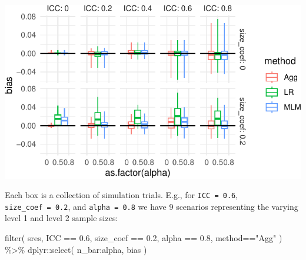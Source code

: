 \documentclass[
]{book}
\newenvironment{Shaded}{\begin{snugshade}}{\end{snugshade}}
\newcommand{\AttributeTok}[1]{\textcolor[rgb]{0.77,0.63,0.00}{#1}}
\newcommand{\ConstantTok}[1]{\textcolor[rgb]{0.00,0.00,0.00}{#1}}
\newcommand{\DecValTok}[1]{\textcolor[rgb]{0.00,0.00,0.81}{#1}}
\newcommand{\FloatTok}[1]{\textcolor[rgb]{0.00,0.00,0.81}{#1}}
\newcommand{\FunctionTok}[1]{\textcolor[rgb]{0.00,0.00,0.00}{#1}}
\newcommand{\NormalTok}[1]{#1}
\newcommand{\OtherTok}[1]{\textcolor[rgb]{0.56,0.35,0.01}{#1}}
\newcommand{\SpecialCharTok}[1]{\textcolor[rgb]{0.00,0.00,0.00}{#1}}
\newcommand{\StringTok}[1]{\textcolor[rgb]{0.31,0.60,0.02}{#1}}
\begin{document}
\begin{Shaded}
\end{Shaded}

\begin{center}\includegraphics[width=0.75\linewidth]{Designing-Simulations-in-R_files/figure-latex/clusterRCT_plot_bias_v1-1} \end{center}

Each box is a collection of simulation trials. E.g., for \texttt{ICC\ =\ 0.6}, \texttt{size\_coef\ =\ 0.2}, and \texttt{alpha\ =\ 0.8} we have 9 scenarios representing the varying level 1 and level 2 sample sizes:

\begin{Shaded}
\begin{Highlighting}[]
\FunctionTok{filter}\NormalTok{( sres, ICC }\SpecialCharTok{==} \FloatTok{0.6}\NormalTok{, size\_coef }\SpecialCharTok{==} \FloatTok{0.2}\NormalTok{,}
\NormalTok{        alpha }\SpecialCharTok{==} \FloatTok{0.8}\NormalTok{, method}\SpecialCharTok{==}\StringTok{"Agg"}\NormalTok{ ) }\SpecialCharTok{\%\textgreater{}\%}
\NormalTok{  dplyr}\SpecialCharTok{::}\FunctionTok{select}\NormalTok{( n\_bar}\SpecialCharTok{:}\NormalTok{alpha, bias )}
\end{Highlighting}
\end{Shaded}
\end{document}
